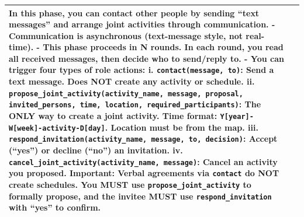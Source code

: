 \begin{table}[h]
\begin{tabular}{p{0.8in}p{4.3in}}
In this phase, you can contact other people by sending ``text messages'' and arrange joint activities through communication.
\vspace{3pt}\newline
- Communication is asynchronous (text-message style, not real-time).
\newline - This phase proceeds in N rounds. In each round, you read all received messages, then decide who to send/reply to.
\newline - You can trigger four types of role actions:
\vspace{3pt}\newline
\quad i. \texttt{contact(message, to)}: Send a text message. Does NOT create any activity or schedule.
\vspace{2pt}\newline
\quad ii. \texttt{propose\_joint\_activity(activity\_name, message, proposal, invited\_persons, time, location, required\_participants)}: The ONLY way to create a joint activity. Time format: \texttt{Y[year]-W[week]-activity-D[day]}. Location must be from the map.
\vspace{2pt}\newline
\quad iii. \texttt{respond\_invitation(activity\_name, message, to, decision)}: Accept (``yes'') or decline (``no'') an invitation.
\vspace{2pt}\newline
\quad iv. \texttt{cancel\_joint\_activity(activity\_name, message)}: Cancel an activity you proposed.
\vspace{4pt}\newline
\textbf{Important}: Verbal agreements via \texttt{contact} do NOT create schedules. You MUST use \texttt{propose\_joint\_activity} to formally propose, and the invitee MUST use \texttt{respond\_invitation} with ``yes'' to confirm.

\\
\bottomrule
\end{tabular}
\end{table}



